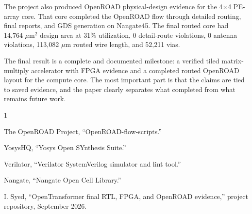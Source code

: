 \documentclass[conference]{IEEEtran}
\begin{document}
The project also produced OpenROAD physical-design evidence for the 4$\times$4 PE-array core. That core completed the OpenROAD flow through detailed routing, final reports, and GDS generation on Nangate45. The final routed core had 14,764 $\mu$m$^2$ design area at 31\% utilization, 0 detail-route violations, 0 antenna violations, 113,082 $\mu$m routed wire length, and 52,211 vias.

The final result is a complete and documented milestone: a verified tiled matrix-multiply accelerator with FPGA evidence and a completed routed OpenROAD layout for the compute core. The most important part is that the claims are tied to saved evidence, and the paper clearly separates what completed from what remains future work.

\begin{thebibliography}{1}

The OpenROAD Project, ``OpenROAD-flow-scripts.''

YosysHQ, ``Yosys Open SYnthesis Suite.''

Verilator, ``Verilator SystemVerilog simulator and lint tool.''

Nangate, ``Nangate Open Cell Library.''

I. Syed, ``OpenTransformer final RTL, FPGA, and OpenROAD evidence,'' project repository, September 2026.

\end{thebibliography}
\end{document}
